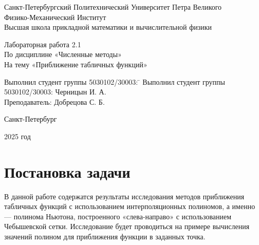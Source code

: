 \documentclass[11pt]{article}
\begin{document}
\begin{titlepage}

    \centering
    
    {\large Санкт-Петербургский Политехнический Университет Петра Великого \\
					Физико-Механический Институт \\
					Высшая школа прикладной математики и вычислительной физики\par}
					
	\vspace{1cm}
    
    {\LARGE Лабораторная работа 2.1 \\ 
    По дисциплине «Численные методы» \\ 
    На тему «Приближение табличных функций»\par}
    
    \vspace{1.5cm} 
    
     \vfill
    
	\begin{center}
        \begin{tabbing}
            Выполнил студент группы 5030102/30003: \= \kill
            Выполнил студент группы 5030102/30003: \> \hspace{8cm}Черницын И. А. \\
            Преподаватель: \> \hspace{8cm}Добрецова С. Б.
        \end{tabbing}
    \end{center}
    
    \vspace{1cm}
    
    {\large Санкт-Петербург\par}
    
    {\large 2025 год\par}
    
\end{titlepage}

\tableofcontents

\section{Постановка задачи}

В данной работе содержатся результаты исследования методов приближения табличных функций с использованием интерполяционных полиномов, а именно --- полинома Ньютона, построенного «слева-направо» с использованием Чебышевской сетки. Исследование будет проводиться на примере вычисления значений полином для приближения функции в заданных точка.
\end{document}
